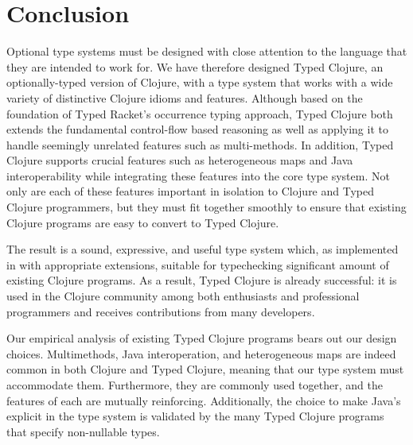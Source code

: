 \section{Conclusion}
\label{sec:conclusion}

Optional type systems must be designed with close attention to the
language that they are intended to work for.
We have therefore designed Typed Clojure, an optionally-typed version of
Clojure, with a type system that works with a wide variety of distinctive
Clojure idioms and features. Although based on the foundation of Typed
Racket's occurrence typing approach, Typed Clojure both extends the
fundamental control-flow based reasoning as well as applying it to
handle seemingly unrelated features such as multi-methods. In
addition, Typed Clojure supports crucial features such as
heterogeneous maps and Java interoperability while integrating these
features into the core type system. Not only are each of these
features important in isolation to Clojure and Typed Clojure
programmers, but they must fit together smoothly to ensure that
existing Clojure programs are easy to convert to Typed Clojure.

The result is a sound, expressive, and useful type system which, as
implemented in \coretyped with appropriate extensions, suitable for
typechecking significant amount of existing Clojure programs.
%
As a result, Typed Clojure is already successful: it is used in
the Clojure community among both enthusiasts and professional
programmers and receives contributions from many developers.

Our empirical analysis of existing Typed Clojure programs bears out
our design choices. Multimethods, Java interoperation, and
heterogeneous maps are indeed common in both Clojure and Typed Clojure,
meaning that our type system must accommodate them. Furthermore, they
are commonly used together, and the features of each are mutually
reinforcing. Additionally, the choice to make Java's 
explicit in the type system is validated by the many Typed Clojure
programs that  specify non-nullable types.


%
%
%
